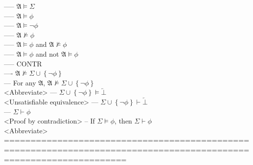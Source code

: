 \documentclass{book}
\newcommand{\inot}{\not}
\newcommand{\contr}{\overleftarrow{\bot}}
\newcommand{\set}[1]{\left\{ #1 \right\}}
\begin{document}
					----- $\mathfrak{A} \vDash \Sigma$ \\
					----- $\mathfrak{A} \vDash \phi$ \\
					----- $\mathfrak{A} \vDash \lnot \phi$ \\
					----- $\mathfrak{A} \inot \vDash \phi$ \\
					----- $\mathfrak{A} \vDash \phi$ and $\mathfrak{A} \inot \vDash \phi$ \\
					----- $\mathfrak{A} \vDash \phi$ and not $\mathfrak{A} \vDash \phi$ \\
					----- CONTR \\
				---- $\mathfrak{A} \inot \vDash \Sigma \cup \set{\lnot \phi}$ \\
			--- For any $\mathfrak{A}$, $\mathfrak{A} \inot \vDash \Sigma \cup \set{\lnot \phi}$ \\ <Abbreviate>
			--- $\Sigma \cup \set{\lnot \phi} \vDash \contr$ \\ <Unsatisfiable equivalence>
			--- $\Sigma \cup \set{\lnot \phi} \vdash \contr$ \\
			--- $\Sigma \vdash \phi$ \\ <Proof by contradiction>
		-- If $\Sigma \vDash \phi$, then $\Sigma \vdash \phi$ \\ <Abbreviate>
	===================================================================================================================
\end{document}
